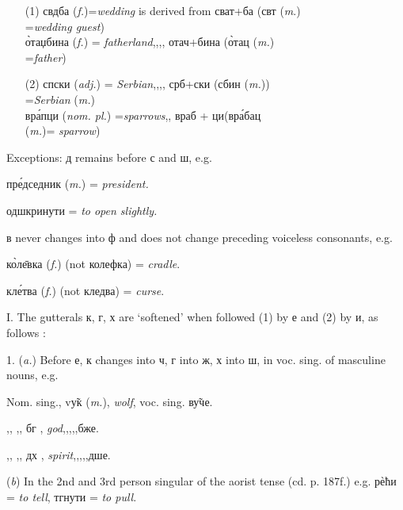 \begin{itemize}
    \item[(1)] свдба (\emph{f.})=\emph{wedding} is derived
        from сват+ба (свт (\emph{m}.)\\
        \hspace*{3in}=\emph{wedding guest})\\
        \`{о}таџбина ({\it f.}) = \textit{fatherland}\quad ,,\qquad,, \quad
        отач+бина (\`{о}тац ({\it m.})\\
        \hspace*{3in}=\emph{father})  
    \item[(2)] спски ({\it adj.}) =
        \emph{Serbian}\qquad,,\qquad,, \quad 
        срб+ски (сбин ({\it m.}))\\
        \hspace*{3in}=\emph{Serbian} ({\it m.})\\
        вр\'{а}пци ({\it nom. pl.}) =\emph{sparrows}\qquad,, \quad
        враб + ци\quad(вр\'{а}бац\\
        \hspace*{3in}({\it m.})= \emph{sparrow})
\end{itemize}

Exceptions: д remains before с and ш, e.g.

\qquad\qquad пр\'{е}дседник ({\it m.}) = \emph{president.}

\qquad\qquad одшкринути = \emph{to open slightly.}

в never changes into ф and does not change preceding voiceless consonants, e.g.

\qquad\qquad к\`{о}л\={е}вка ({\it f.}) (not колефка) = \textit{cradle}.

\qquad\qquad кл\'{е}тва ({\it f.}) (not кледва) = \textit{curse}.


I. The gutterals к, г, х are `softened' when followed (1) by е and (2) by и, as follows :
\newpage

1. ({\it a.}) Before е, к changes into ч, г into ж, х into ш, in voc. sing. of masculine nouns, e.g.

Nom. sing., v\~{у}к ({\it m.}), \emph{wolf}, voc. sing. в\~{у}че.

\quad,, \quad ,, \qquad бг \masc, \emph{god},\qquad,,\quad,,\quad бже.

\quad,, \quad ,, \qquad дх \masc, \emph{spirit},\quad,,\quad,,\quad дше.

({\it b}) In the 2nd and 3rd person singular of the aorist tense (cd. p. 187f.) e.g. р\`{е}ћи = \emph{to tell}, тгнути = \emph{to pull}.


